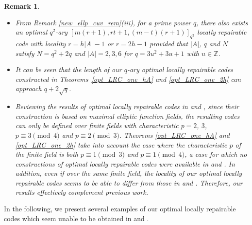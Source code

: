 \documentclass[journal,12pt,onecolumn]{IEEEtran}
\newtheorem{remark}{Remark}
\begin{document}
\begin{remark}\label{opt_LRC_one_re}
    \begin{itemize}
        \item[(i)] From Remark \ref{new_ellp_cuv_rem}(iii), for a prime power \(q\), there also exists an optimal \( q^2 \)-ary \([m(r+1), rt+1, (m-t)(r+1)]_{q^2}\) locally repairable code with locality \( r = h|A| - 1 \) or \( r = 2h - 1 \) provided that \(|A|\), \( q \) and \(N\) satisfy \(N = q^2 + 2q\) and \(|A| = 2,3,6\) for \(q = 3u^2 + 3u + 1\) with \(u\in\mathbb{Z}\). 
        \item[(ii)] It can be seen that the length of our \(q\)-ary optimal locally repairable codes constructed in Theorems~\ref{opt_LRC_one_hA} and \ref{opt_LRC_one_2h} can approach \(q + 2\sqrt{q}\). 
        \item[(iii)] Reviewing the results of optimal locally repairable codes in \cite{Optimal_Locally_Repairable_Codes_Via_Elliptic_Curves} and \cite{MA2023105686}, since their construction is based on maximal elliptic function fields, the resulting codes can only be defined over finite fields with characteristic \(p=2\), \(3\), \( p \equiv 3 \pmod{4} \) and \(p \equiv 2 \pmod{3}\). Theorems \ref{opt_LRC_one_hA} and \ref{opt_LRC_one_2h} take into account the case where the characteristic \(p\) of the finite field is both \( p \equiv 1 \pmod{3} \) and \( p \equiv 1 \pmod{4} \), a case for which no constructions of optimal locally repairable codes were available in \cite{Optimal_Locally_Repairable_Codes_Via_Elliptic_Curves} and \cite{MA2023105686}. In addition, even if over the same finite field, the locality of our optimal locally repairable codes seems to be able to differ from those in \cite{Optimal_Locally_Repairable_Codes_Via_Elliptic_Curves} and \cite{MA2023105686}. Therefore, our results effectively complement previous work. 
    \end{itemize}
\end{remark}



In the following, we present several examples of our optimal locally repairable codes which seem unable to be obtained in \cite{Optimal_Locally_Repairable_Codes_Via_Elliptic_Curves} and \cite{MA2023105686}. 
\end{document}
